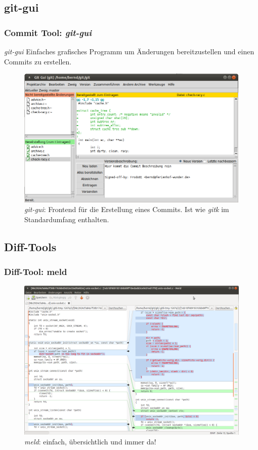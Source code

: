 \documentclass{beamer}
\begin{document}
\subsection{git-gui}
\begin{frame}\frametitle{Commit Tool: \textit{git-gui}}
\begin{block}{\textit{git-gui}}
Einfaches grafisches Programm um Änderungen bereitzustellen und einen Commits zu erstellen. 
\end{block}

\begin{figure}
\includegraphics[scale=1.1]{Bilder/git_gui} 
\caption{\textit{git-gui}: Frontend für die Erstellung eines Commits. Ist wie \textit{gitk} im Standardumfang enthalten.}
\end{figure}
\end{frame}

\subsection{Diff-Tools}
\begin{frame}\frametitle{Diff-Tool: meld}

\begin{figure}
\includegraphics[scale=0.9]{Bilder/meld} 
\caption{\textit{meld}: einfach, übersichtlich und immer da!}
\end{figure}
\end{frame}
\end{document}
